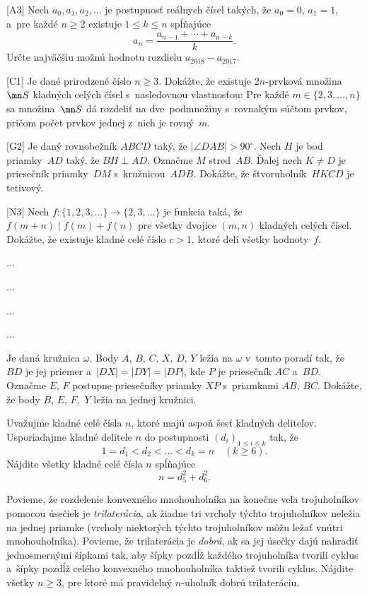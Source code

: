 {%
[A3] Nech $a_0,a_1,a_2,\ldots$ je postupnosť reálnych čísel takých, že $a_0=0$, $a_1=1$, a~pre každé $n \ge 2$ existuje $1 \leq k \leq n$ spĺňajúce
$$
a_n = \frac{a_{n-1}+\cdots+a_{n-k}}{k}.
$$
Určte najväčšiu možnú hodnotu rozdielu $a_{2018}-a_{2017}$.
}

{%
[C1] Je dané prirodzené číslo $n \ge 3$. Dokážte, že existuje $2n$-prvková množina~$\mn S$ kladných celých čísel s~nasledovnou vlastnosťou: Pre každé $m \in \{2,3,\ldots,n\}$ sa množina~$\mn S$ dá rozdeliť na dve~podmnožiny s~rovnakým súčtom prvkov, pričom počet prvkov jednej z~nich je rovný~$m$.
}

{%
[G2] Je daný rovnobežník $ABCD$ taký, že $|\angle DAB|>90^\circ$. Nech $H$ je bod priamky~$AD$ taký, že $BH \perp AD$. Označme $M$ stred~$AB$. Ďalej nech $K \ne D$ je priesečník priamky~$DM$ s~kružnicou~$ADB$. Dokážte, že štvoruholník~$HKCD$ je tetivový.
}

{%
[N3] Nech $f:\{1,2,3,\ldots\} \to \{2,3,\ldots\}$ je funkcia taká, že $f(m+n)\mid f(m)+f(n)$ pre všetky dvojice $(m,n)$ kladných celých čísel. Dokážte, že existuje kladné celé číslo $c>1$, ktoré delí všetky hodnoty~$f$.
}

{%
...}

{%
...}

{%
...}

{%
...}

{%
Je daná kružnica $\omega$. Body $A$, $B$, $C$, $X$, $D$, $Y$ ležia na $\omega$ v~tomto poradí tak, že $BD$ je jej priemer a~$|DX|=|DY|=|DP|$, kde $P$ je priesečník $AC$ a~$BD$.
Označme $E$, $F$ postupne priesečníky priamky $XP$ s~priamkami $AB$, $BC$. Dokážte, že body $B$, $E$, $F$,~$Y$ ležia na jednej kružnici.}

{%
Uvažujme kladné celé čísla $n$, ktoré majú aspoň šesť kladných deliteľov. Usporiadajme kladné delitele $n$ do postupnosti $(d_i)_{1\le i\le k}$ tak, že
$$
1=d_1 <d_2 <\dots <d_k =n \quad (k\ge 6).
$$
Nájdite všetky kladné celé čísla $n$ spĺňajúce
$$
n = d_5^2+d_6^2.
$$}

{%
Povieme, že rozdelenie konvexného mnohouholníka na konečne veľa trojuholníkov pomocou úsečiek je {\it trilaterácia}, ak žiadne tri vrcholy týchto trojuholníkov neležia na jednej priamke (vrcholy niektorých týchto trojuholníkov môžu ležať vnútri mnohouholníka). Povieme, že trilaterácia je {\it dobrá}, ak sa jej úsečky dajú nahradiť jednosmernými šípkami tak, aby šípky pozdĺž každého trojuholníka tvorili cyklus a~šípky pozdĺž celého konvexného mnohouholníka taktiež tvorili cyklus. Nájdite všetky $n \ge 3$, pre ktoré má pravidelný $n$-uholník dobrú trilateráciu.}


